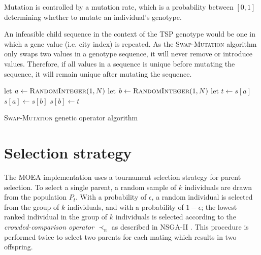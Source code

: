 Mutation is controlled by a mutation rate, which is a probability between $[0, 1]$ determining whether to mutate an individual's genotype.

An infeasible child sequence in the context of the \ac{TSP} genotype would be one in which a gene value (i.e. city index) is repeated. As the \textsc{Swap-Mutation} algorithm only swaps two values in a genotype sequence, it will never remove or introduce values. Therefore, if all values in a sequence is unique before mutating the sequence, it will remain unique after mutating the sequence.

\begin{algorithm}
\begin{algorithmic}[1]
    \State let $a \gets \textsc{RandomInteger}(1, N)$
    \State let $b \gets \textsc{RandomInteger}(1, N)$
    \State let $\textit{t} \gets s[a]$
    \State $s[a] \gets s[b]$
    \State $s[b] \gets \textit{t}$
\EndFunction
\end{algorithmic}
\caption{\textsc{Swap-Mutation} genetic operator algorithm}
\label{alg:swap}
\end{algorithm}

\section*{Selection strategy}

The \ac{MOEA} implementation uses a tournament selection strategy for parent selection. To select a single parent, a random sample of $k$ individuals are drawn from the population $P_t$. With a probability of $\epsilon$, a random individual is selected from the group of $k$ individuals, and with a probability of $1 - \epsilon$; the lowest ranked individual in the group of $k$ individuals is selected according to the \textit{crowded-comparison operator} $\prec_n$ as described in NSGA-II \cite{deb2002fast}. This procedure is performed twice to select two parents for each mating which results in two offspring.

%
%
%
%
%

\newcommand{\displayconvergenceplot}[1]{
    \begin{tikzpicture}[scale=0.65]
    \begin{axis}[view={0}{90},
        xlabel=Crossover Rate,
        ylabel=Mutation Rate,
        ymode=log,
        title=Convergence,
        log ticks with fixed point,
        y tick label style={/pgf/number format/1000 sep=\,},
        colormap name={RdBu-11},
        colorbar,
        colorbar style={
            title=Value
        }]
    \addplot3[surf] table[x index=0,y index=1,z index=3] {#1};
    \end{axis}
    \end{tikzpicture}
}

